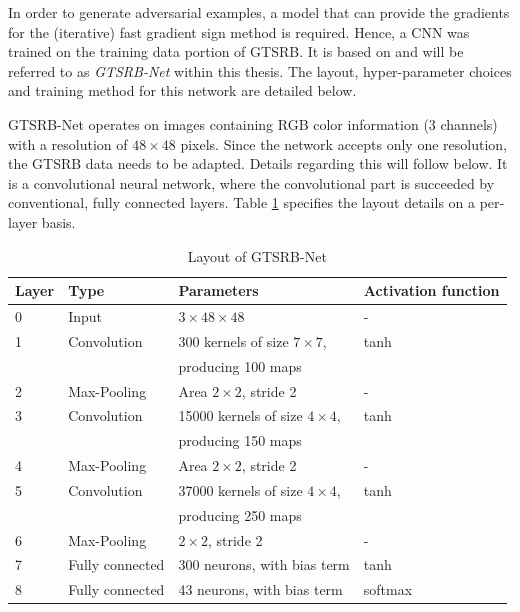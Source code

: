 \documentclass[11pt, a4paper]{article}
\begin{document}

In order to generate adversarial examples, a model that can provide the gradients for the (iterative) fast gradient sign method is required. Hence, a CNN was trained on the training data portion of GTSRB. It is based on \cite{multi-column-neural-network-gtsrb} and will be referred to as \emph{GTSRB-Net} within this thesis. The layout, hyper-parameter choices and training method for this network are detailed below.

GTSRB-Net operates on images containing RGB color information (3 channels) with a resolution of $48 \times 48$ pixels. Since the network accepts only one resolution, the GTSRB data needs to be adapted. Details regarding this will follow below. It is a convolutional neural network, where the convolutional part is succeeded by conventional, fully connected layers. Table \ref{tab:gtsrb-layout} specifies the layout details on a per-layer basis.

\begin{table}[h!tb]
	\centering
	\begin{tabular}{|l|lll|}
		\hline
		Layer & Type & Parameters & Activation function \\
		\hline
		0 & Input & $3 \times 48 \times 48$ & - \\
		1 & Convolution & 300 kernels of size $7 \times 7$, & tanh \\
		& & producing 100 maps & \\
		2 & Max-Pooling & Area $2\times 2$, stride 2 & - \\
		3 & Convolution & 15000 kernels of size $4 \times 4$, & tanh \\
		& & producing 150 maps & \\
		4 & Max-Pooling & Area $2\times 2$, stride 2 & - \\
		5 & Convolution & 37000 kernels of size $4 \times 4$, & tanh \\
		& & producing 250 maps & \\
		6 & Max-Pooling & $2\times 2$, stride 2 & - \\
		7 & Fully connected & 300 neurons, with bias term & tanh \\
		8 & Fully connected & 43 neurons, with bias term & softmax \\
		\hline
	\end{tabular}
	\caption{Layout of GTSRB-Net}
	\label{tab:gtsrb-layout}
\end{table}
\end{document}

